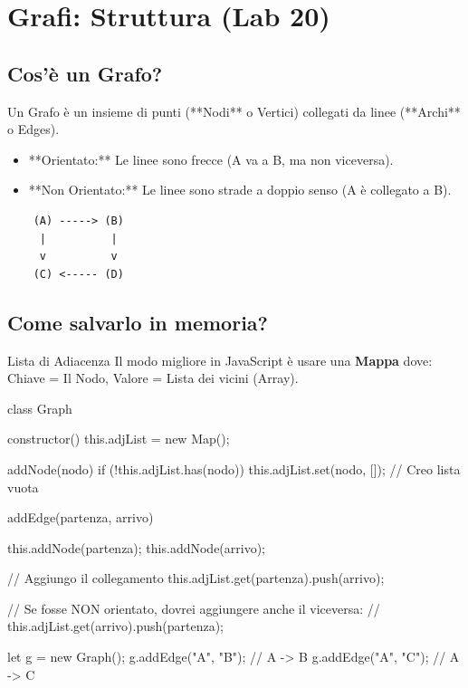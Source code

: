 \section{Grafi: Struttura (Lab 20)}

\subsection{Cos'è un Grafo?}
Un Grafo è un insieme di punti (**Nodi** o Vertici) collegati da linee (**Archi** o Edges).
\begin{itemize}
    \item **Orientato:** Le linee sono frecce (A va a B, ma non viceversa).
    \item **Non Orientato:** Le linee sono strade a doppio senso (A è collegato a B).
\end{itemize}

\begin{verbatim}
    (A) -----> (B)
     |          |
     v          v
    (C) <----- (D)
\end{verbatim}

\subsection{Come salvarlo in memoria?}
\begin{concept}{Lista di Adiacenza}
Il modo migliore in JavaScript è usare una \textbf{Mappa} dove:
Chiave = Il Nodo, Valore = Lista dei vicini (Array).
\end{concept}
\begin{jsbox}
class Graph {
    constructor() {
        this.adjList = new Map();
    }

    addNode(nodo) {
        if (!this.adjList.has(nodo)) {
            this.adjList.set(nodo, []); // Creo lista vuota
        }
    }

    addEdge(partenza, arrivo) {
        this.addNode(partenza);
        this.addNode(arrivo);
        
        // Aggiungo il collegamento
        this.adjList.get(partenza).push(arrivo);
        
        // Se fosse NON orientato, dovrei aggiungere anche il viceversa:
        // this.adjList.get(arrivo).push(partenza);
    }
}

let g = new Graph();
g.addEdge("A", "B"); // A -> B
g.addEdge("A", "C"); // A -> C
\end{jsbox}
